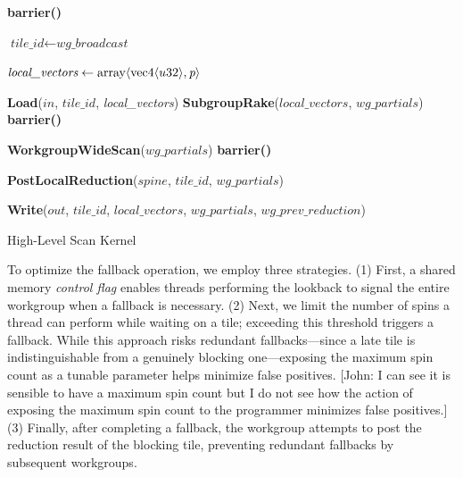 \documentclass[sigconf]{acmart}
\newcommand{\john}[1]{{\footnotesize\color{cyan}[John: #1]}}
\begin{document}
\begin{algorithm}
  \small
  \SetAlgoLined

  \textbf{barrier()}\;

  $\textit{tile\_id} \gets \textit{wg\_broadcast}$\;

  $\textit{local\_vectors} \gets \textnormal{array}\langle \textnormal{vec4}\langle u32\rangle, \textit{p} \rangle$\;

  \textbf{Load}($\textit{in}$, $\textit{tile\_id}$, \textit{local\_vectors})\;
  \textbf{SubgroupRake}($\textit{local\_vectors}$, $\textit{wg\_partials}$)\;
  \textbf{barrier()}\;

  \textbf{WorkgroupWideScan}($\textit{wg\_partials}$)\;
  \textbf{barrier()}\;

  \textbf{PostLocalReduction}($\textit{spine}$, $\textit{tile\_id}$, $\textit{wg\_partials}$)\;

  \textbf{Write}($\textit{out}$, $\textit{tile\_id}$, $\textit{local\_vectors}$, $\textit{wg\_partials}$, $\textit{wg\_prev\_reduction}$)\;

  \caption{High-Level Scan Kernel}
\end{algorithm}

To optimize the fallback operation, we employ three strategies. (1) First, a shared memory \emph{control flag} enables threads performing the lookback to signal the entire workgroup when a fallback is necessary. (2) Next, we limit the number of spins a thread can perform while waiting on a tile; exceeding this threshold triggers a fallback. While this approach risks redundant fallbacks---since a late tile is indistinguishable from a genuinely blocking one---exposing the maximum spin count as a tunable parameter helps minimize false positives. \john{I can see it is sensible to have a maximum spin count but I do not see how the action of exposing the maximum spin count to the programmer minimizes false positives.} (3) Finally, after completing a fallback, the workgroup attempts to post the reduction result of the blocking tile, preventing redundant fallbacks by subsequent workgroups.
\end{document}
